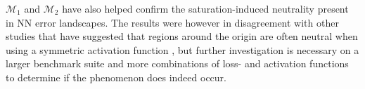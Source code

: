 \documentclass[conference]{IEEEtran}
\begin{document}
${\mathcal{M}_1}$ and ${\mathcal{M}_2}$ have also helped confirm the saturation-induced neutrality present in NN error landscapes. The results were however in disagreement with other studies that have suggested that regions around the origin are often neutral when using a symmetric activation function \cite{lecun2012efficient}, but further investigation is necessary on a larger benchmark suite and more combinations of loss- and activation functions to determine if the phenomenon does indeed occur.

%
%



%
%
\end{document}
